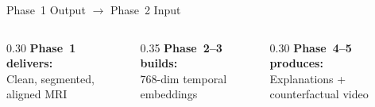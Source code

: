 \documentclass[aspectratio=169, dvipsnames]{beamer}
\begin{document}
\begin{frame}{Phase~1 Output $\to$ Phase~2 Input}
    \vspace{0.5em}

    \begin{columns}
        \begin{column}{0.30\textwidth}
            \centering
            \scriptsize
            \textbf{Phase~1 delivers:}\\
            Clean, segmented, aligned MRI
        \end{column}
        \begin{column}{0.35\textwidth}
            \centering
            \scriptsize
            \textbf{Phase~2--3 builds:}\\
            768-dim temporal embeddings
        \end{column}
        \begin{column}{0.30\textwidth}
            \centering
            \scriptsize
            \textbf{Phase~4--5 produces:}\\
            Explanations + counterfactual video
        \end{column}
    \end{columns}
\end{frame}
\end{document}
